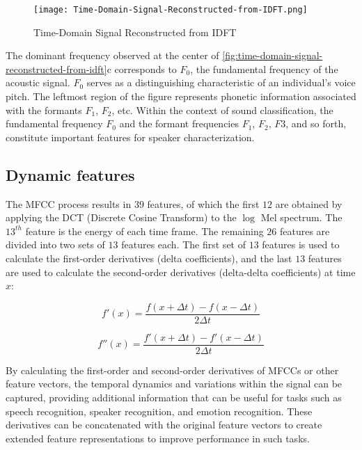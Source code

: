 \vspace{-1em}
\begin{figure}[H]
    \centering
    \texttt{[image: Time-Domain-Signal-Reconstructed-from-IDFT.png]}
    \caption{Time-Domain Signal Reconstructed from IDFT}
    \label{fig:time-domain-signal-reconstructed-from-idft}
\end{figure}
\vspace{-1em}

The dominant frequency observed at the center of
\autoref{fig:time-domain-signal-reconstructed-from-idft}c
corresponds to $F_0$, the fundamental frequency of the acoustic 
signal. $F_0$ serves as a distinguishing characteristic of an 
individual's voice pitch. The leftmost region of the figure 
represents phonetic information associated with the formants 
$F_1$, $F_2$, etc. Within the context of sound classification, the 
fundamental frequency $F_0$ and the formant frequencies $F_1$, $F_2$, $F3$, 
and so forth, constitute important features for speaker 
characterization.

\subsection{Dynamic features}

The MFCC process results in $39$ features, of which the first $12$ 
are obtained by applying the DCT (Discrete Cosine Transform) 
to the $\log$ Mel spectrum. The $13^{th}$ feature is the energy of 
each time frame. The remaining $26$ features are divided into 
two sets of $13$ features each. The first set of $13$ features is 
used to calculate the first-order derivatives (delta 
coefficients), and the last $13$ features are used to calculate 
the second-order derivatives (delta-delta coefficients) at 
time $x$:

\begin{equation}
    f'(x) = \frac{f(x + \Delta t) - f(x - \Delta t)}{2\Delta t}
\end{equation}

\begin{equation}
    f''(x) = \frac{f'(x + \Delta t) - f'(x - \Delta t)}{2\Delta t}
\end{equation}

By calculating the first-order and second-order derivatives 
of MFCCs or other feature vectors, the temporal dynamics and 
variations within the signal can be captured, providing 
additional information that can be useful for tasks such as 
speech recognition, speaker recognition, and emotion 
recognition. These derivatives can be concatenated with the 
original feature vectors to create extended feature 
representations to improve performance in such tasks.
